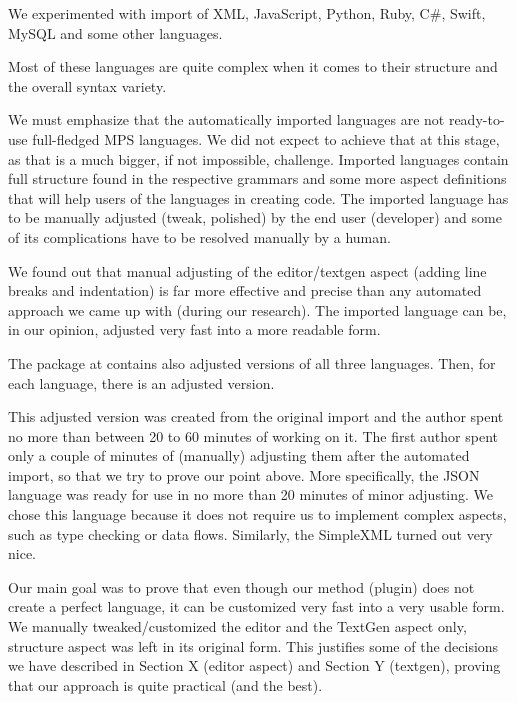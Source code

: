 We experimented with import of XML, JavaScript, Python, Ruby, C\#, Swift, MySQL and some other languages.

Most of these languages are quite complex when it comes to their structure and the overall syntax variety.

We must emphasize that the automatically imported languages are not ready-to-use full-fledged MPS languages.
We did not expect to achieve that at this stage, as that is a much bigger, if not impossible, challenge.
Imported languages contain full structure found in the respective grammars and some more aspect definitions that will help users of the languages in creating code.
The imported language has to be manually adjusted (tweak, polished) by the end user (developer) and some of its complications have to be resolved manually by a human.

We found out that manual adjusting of the editor/textgen aspect (adding line breaks and indentation) is far more effective and precise than any automated approach we came up with (during our research).
The imported language can be, in our opinion, adjusted very fast into a more readable form.

The package at  contains also adjusted versions of all three languages.
Then, for each language, there is an adjusted version.

This adjusted version was created from the original import and the author spent no more than between 20 to 60 minutes of working on it.
The first author spent only a couple of minutes of (manually) adjusting them after the automated import, so that we try to prove our point above.
More specifically, the JSON language was ready for use in no more than 20 minutes of minor adjusting.
We chose this language because it does not require us to implement complex aspects, such as type checking or data flows.
Similarly, the SimpleXML turned out very nice.

Our main goal was to prove that even though our method (plugin) does not create a perfect language, it can be customized very fast into a very usable form.
We manually tweaked/customized the editor and the TextGen aspect only, structure aspect was left in its original form.
This justifies some of the decisions we have described in Section X (editor aspect) and Section Y (textgen), proving that our approach is quite practical (and the best).

